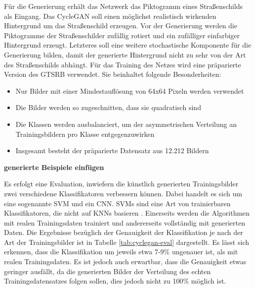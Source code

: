 Für die Generierung erhält das Netzwerk das Piktogramm eines Straßenschilds als Eingang. Das \ac{CycleGAN} soll einen möglichst realistisch wirkenden Hintergrund um das Straßenschild erzeugen. Vor der Generierung werden die Piktogramme der Straßenschilder zufällig rotiert und ein zufälliger einfarbiger Hintergrund erzeugt. Letzteres soll eine weitere stochastische Komponente für die Generierung bilden, damit der generierte Hintergrund nicht zu sehr von der Art des Straßenschilds abhängt. Für das Training des Netzes wird eine präparierte Version des \ac{GTSRB} verwendet. Sie beinhaltet folgende Besonderheiten:
\begin{itemize}
    \item Nur Bilder mit einer Mindestauflösung von 64x64 Pixeln werden verwendet
    \item Die Bilder werden so zugeschnitten, dass sie quadratisch sind
    \item Die Klassen werden ausbalanciert, um der asymmetrischen Verteilung an Trainingsbildern pro Klasse entgegenzuwirken
    \item Insgesamt besteht der präparierte Datensatz aus 12.212 Bildern
  \end{itemize}
\cite{gtsrbGAN}

\textbf{generierte Beispiele einfügen}

Es erfolgt eine Evaluation, inwiefern die künstlich generierten Trainingsbilder zwei verschiedene Klassifikatoren verbessern können. Dabei handelt es sich um eine sogenannte \ac{SVM} und ein \ac{CNN}. \acp{SVM} sind eine Art von trainierbaren Klassifikatoren, die nicht auf \acp{KNN} basieren \cite{visualApproach}. Einerseits werden die Algorithmen mit realen Trainingsdaten trainiert und andererseits vollständig mit generierten Daten. Die Ergebnisse bezüglich der Genauigkeit der Klassifikation je nach der Art der Trainingsbilder ist in Tabelle \ref{tab:cyclegan-eval} dargestellt. Es lässt sich erkennen, dass die Klassifikation um jeweils etwa 7-9\% ungenauer ist, als mit realen Trainingsdaten. Es ist jedoch auch erwartbar, dass die Genauigkeit etwas geringer ausfällt, da die generierten Bilder der Verteilung des echten Trainingsdatensatzes folgen sollen, dies jedoch nicht zu 100\% möglich ist. \cite{gtsrbGAN}

